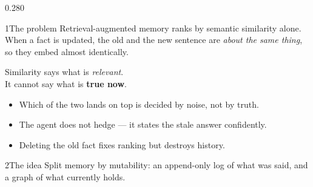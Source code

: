 \documentclass[final]{beamer}
\newcommand{\Lead}{\fontsize{26}{32}\selectfont}
\newcommand{\Body}{\fontsize{20}{26}\selectfont}
\newcommand{\Small}{\fontsize{17}{22}\selectfont}
\newcommand{\gold}[1]{{\color{IGGold}\bfseries #1}}
\begin{document}
\begin{frame}[t]
\vspace{0.9cm}

\begin{columns}[t, totalwidth=0.965\textwidth, onlytextwidth]

\begin{column}{0.280\textwidth}

\begin{sect}{1\quad The problem}
\Body\justifying
Retrieval-augmented memory ranks by semantic similarity alone. When a fact is
updated, the old and the new sentence are \emph{about the same thing}, so they
embed almost identically.

\vspace{0.7cm}
\centering
{}

\vspace{0.7cm}
\begin{panel}[GoldTint]
\centering\Lead
Similarity says what is \emph{relevant}.\\
It cannot say what is \gold{true now}.
\end{panel}

\vspace{0.6cm}
\justifying\Body
\begin{itemize}[leftmargin=*, itemsep=4mm]
  \item Which of the two lands on top is decided by noise, not by truth.
  \item The agent does not hedge — it states the stale answer confidently.
  \item Deleting the old fact fixes ranking but destroys history.
\end{itemize}
\end{sect}

\vfill

\begin{sect}{2\quad The idea}
\Body\justifying
Split memory by mutability: an append-only log of what was said, and a graph of
what currently holds.


\end{sect}
\end{column}
\end{columns}
\end{frame}
\end{document}
